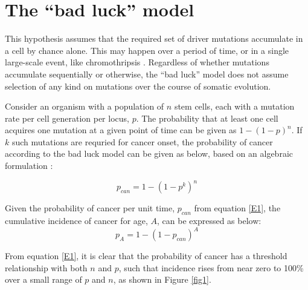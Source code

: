 \documentclass[12pt,onecolumn,twoside]{article}
\begin{document}
\section{The ``bad luck'' model}

This hypothesis assumes that the required set of driver mutations accumulate in a cell by chance alone. This may happen over a period of time, or in a single large-scale event, like chromothripsis \autocite{Stephens2011}. Regardless of whether mutations accumulate sequentially or otherwise, the ``bad luck'' model does not assume selection of any kind on mutations over the course of somatic evolution.

Consider an organism with a population of $n$ stem cells, each with a mutation rate per cell generation per locus, $p$. The probability that at least one cell acquires one mutation at a given point of time can be given as $1-(1-p)^{n}$. If $k$ such mutations are requried for cancer onset, the probability of cancer according to the bad luck model can be given as below, based on an algebraic formulation \autocite{Calabrese2010}:

\begin{equation}
	\label{E1}
	p_{can} = 1-(1-p^{k})^{n}
\end{equation}

Given the probability of cancer per unit time, $p_{can}$ from equation \ref{E1}, the cumulative incidence of cancer for age, $A$, can be expressed as below:
\begin{equation}
	\label{E2}
	p_{A} = 1-(1-p_{can})^{A}
\end{equation}

From equation \ref{E1}, it is clear that the probability of cancer has a threshold relationship with both $n$ and $p$, such that incidence rises from near zero to 100\% over a small range of $p$ and $n$, as shown in Figure \ref{fig1}.
\end{document}
